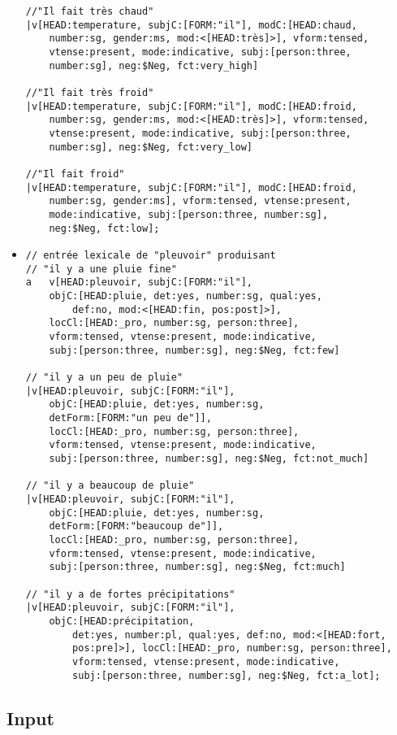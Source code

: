\documentclass[11pt]{article}
\begin{document}
\begin{itemize}
\begin{verbatim}
//"Il fait très chaud"
|v[HEAD:temperature, subjC:[FORM:"il"], modC:[HEAD:chaud, 
	number:sg, gender:ms, mod:<[HEAD:très]>], vform:tensed, 
	vtense:present, mode:indicative, subj:[person:three, 
	number:sg], neg:$Neg, fct:very_high]

//"Il fait très froid"
|v[HEAD:temperature, subjC:[FORM:"il"], modC:[HEAD:froid, 
	number:sg, gender:ms, mod:<[HEAD:très]>], vform:tensed,
	vtense:present, mode:indicative, subj:[person:three, 
	number:sg], neg:$Neg, fct:very_low]

//"Il fait froid"
|v[HEAD:temperature, subjC:[FORM:"il"], modC:[HEAD:froid, 
	number:sg, gender:ms], vform:tensed, vtense:present, 
	mode:indicative, subj:[person:three, number:sg], 
	neg:$Neg, fct:low]; 
\end{verbatim}
	
\bigskip
\item \begin{verbatim}
// entrée lexicale de "pleuvoir" produisant
// "il y a une pluie fine"
a	v[HEAD:pleuvoir, subjC:[FORM:"il"], 
	objC:[HEAD:pluie, det:yes, number:sg, qual:yes,
		def:no, mod:<[HEAD:fin, pos:post]>], 
	locCl:[HEAD:_pro, number:sg, person:three], 
	vform:tensed, vtense:present, mode:indicative, 
	subj:[person:three, number:sg], neg:$Neg, fct:few]
	
// "il y a un peu de pluie"
|v[HEAD:pleuvoir, subjC:[FORM:"il"], 
	objC:[HEAD:pluie, det:yes, number:sg, 
	detForm:[FORM:"un peu de"]], 
	locCl:[HEAD:_pro, number:sg, person:three], 
	vform:tensed, vtense:present, mode:indicative, 
	subj:[person:three, number:sg], neg:$Neg, fct:not_much]

// "il y a beaucoup de pluie"
|v[HEAD:pleuvoir, subjC:[FORM:"il"], 
	objC:[HEAD:pluie, det:yes, number:sg, 
	detForm:[FORM:"beaucoup de"]], 
	locCl:[HEAD:_pro, number:sg, person:three], 
	vform:tensed, vtense:present, mode:indicative, 
	subj:[person:three, number:sg], neg:$Neg, fct:much]

// "il y a de fortes précipitations"
|v[HEAD:pleuvoir, subjC:[FORM:"il"], 
	objC:[HEAD:précipitation,
        det:yes, number:pl, qual:yes, def:no, mod:<[HEAD:fort,
        pos:pre]>], locCl:[HEAD:_pro, number:sg, person:three],
        vform:tensed, vtense:present, mode:indicative,
        subj:[person:three, number:sg], neg:$Neg, fct:a_lot]; 
\end{verbatim}

\end{itemize}

\subsection{Input}
\end{document}

